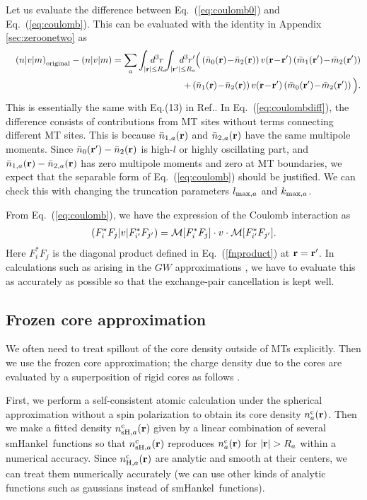 \documentclass[a4paper,10pt,aip,onecolumn,amsmath,amssymb,floatfix,rmp]{revtex4-1}
\newcommand{\bfr}{{\bf r}}
\newcommand{\req}[1]{\mbox{Eq.~\!(\ref{#1})}}
\def\smh{smHankel}
\def\nc{n^{\rm c}}
\def\MM{{\cal M}}
\def\inta{\int_{|\bfr|\leq R_a}\!\!\!\!\!\!\!\!\!\!\!\!}
\def\intad{\int_{|\bfr'|\leq R_a}\!\!\!\!\!\!\!\!\!\!\!\!}
\begin{document}
Let us evaluate the difference between \req{eq:coulomb0} and \req{eq:coulomb}.
This can be evaluated with the identity in Appendix \ref{sec:zeroonetwo} as
\begin{eqnarray}
&&\left(n|v|m\right)_{\rm original}-\left(n|v|m\right)= 
\sum_a \inta d^3r \intad d^3r'\Big(
\left( \bar{n}_0(\bfr) \!-\! \bar{n}_2(\bfr) \right) 
v(\bfr\!-\!\bfr') \left( \bar{m}_1(\bfr')\!-\!\bar{m}_2(\bfr') \right)  \nonumber \\
&&+\left( \bar{n}_1(\bfr)\!-\!\bar{n}_2(\bfr) \right) 
v(\bfr\!-\!\bfr') \left( \bar{m}_0(\bfr')\!-\!\bar{m}_2(\bfr') \right)\Big).
\label{eq:coulombdiff}
\end{eqnarray}
This is essentially the same with Eq.(13) in Ref..  In
\req{eq:coulombdiff}, the difference consists of contributions from MT
sites without terms connecting different MT sites. This is because
$\bar{n}_{1,a}(\bfr)$ and $\bar{n}_{2,a}(\bfr)$ have the same multipole
moments.  Since $\bar{n}_0(\bfr') - \bar{n}_2(\bfr)$ is high-$l$ or
highly oscillating part, and $\bar{n}_{1,a}(\bfr)-\bar{n}_{2,a}(\bfr)$
has zero multipole moments and zero at MT boundaries, we expect that the
separable form of \req{eq:coulomb} should be justified. We can check
this with changing the truncation parameters $l_{{\rm max},a}$ and 
$k_{{\rm max},a}$.

From \req{eq:coulomb}, we have the expression of the Coulomb
interaction as
\begin{eqnarray}
\left(F^*_i F_j|v|F^*_{i'}F_{j'}\right) = \MM[F^*_iF_j] \cdot v \cdot \MM[F^*_{i'}F_{j'}].
\label{eq:ffvff}
\end{eqnarray}
Here $F^*_i F_j$ is the diagonal product defined in \req{fnproduct} at
$\bfr=\bfr'$.  In calculations such as arising in the $GW$
approximations \cite{kotani07a}, we have to evaluate this as accurately
as possible so that the exchange-pair cancellation is kept well.


\subsection{Frozen core approximation}
\label{sec:frozencore} We often need to treat spillout of the core
density outside of MTs explicitly. Then we use the frozen core
approximation; the charge density due to the cores are evaluated by a
superposition of rigid cores as follows \cite{lmfchap}.

First, we perform a self-consistent atomic calculation under the
spherical approximation without a spin polarization to obtain its core
density $\nc_a(\bfr)$. Then we make a fitted density $\nc_{{\rm
sH},a}(\bfr)$ given by a linear combination of several \smh\ functions
so that $\nc_{{\rm sH},a}(\bfr)$ reproduces $\nc_{a}(\bfr)$ for
$|\bfr|>R_a$ within a numerical accuracy. Since $\nc_{{\rm H},a}(\bfr)$
are analytic and smooth at their centers, we can treat them numerically
accurately (we can use other kinds of analytic functions such as
gaussians instead of \smh\ functions).\\
\end{document}
